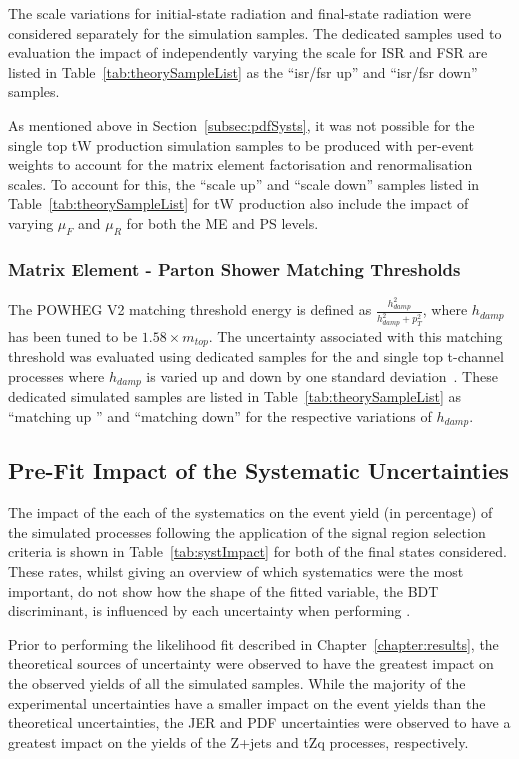 The scale variations for initial-state radiation and final-state radiation were considered separately for the \ttbar simulation samples.
The dedicated \ttbar samples used to evaluation the impact of independently varying the scale for ISR and FSR are listed in Table~\ref{tab:theorySampleList} as the ``isr/fsr up'' and ``isr/fsr down'' samples.

As mentioned above in Section~\ref{subsec:pdfSysts}, it was not possible for the single top tW production simulation samples to be produced with per-event weights to account for the matrix element factorisation and renormalisation scales.
To account for this, the ``scale up'' and ``scale down'' samples listed in Table~\ref{tab:theorySampleList} for tW production also include the impact of varying $\mu_{F}$ and $\mu_{R}$ for both the ME and PS levels.

\subsubsection{Matrix Element - Parton Shower Matching Thresholds}
The POWHEG V2 matching threshold energy is defined as $\frac{h_{damp}^{2}}{h_{damp}^{2}+p_{T}^{2}}$, where $h_{damp}$ has been tuned to be $1.58 \times m_{top}$.
The uncertainty associated with this matching threshold was evaluated using dedicated samples for the \ttbar and single top t-channel processes where $h_{damp}$ is varied up and down by one standard deviation~\cite{CMS:2016kle}.
These dedicated simulated samples are listed in Table~\ref{tab:theorySampleList} as ``matching up '' and ``matching down'' for the respective variations of $h_{damp}$.

\subsection{Pre-Fit Impact of the Systematic Uncertainties}\label{sec:uncertainitiesPreFitImpact}
The impact of the each of the systematics on the event yield (in percentage) of the simulated processes following the application of the signal region selection criteria is shown in Table~\ref{tab:systImpact} for both of the final states considered.
These rates, whilst giving an overview of which systematics were the most important, do not show how the shape of the fitted variable, the BDT discriminant, is influenced by each uncertainty when performing .

Prior to performing the likelihood fit described in Chapter~\ref{chapter:results}, the theoretical sources of uncertainty were observed to have the greatest impact on the observed yields of all the simulated samples.
While the majority of the experimental uncertainties have a smaller impact on the event yields than the theoretical uncertainties, the JER and PDF uncertainties were observed to have a greatest impact on the yields of the Z+jets and tZq processes, respectively.

